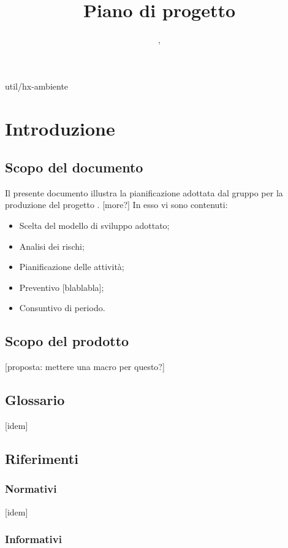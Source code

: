 
 {util/hx-ambiente}
\author{\LB, \PB}
\supervisor{\GG, \MM}
\title{Piano di progetto}

\renewcommand{\arraystretch}{1.5}
\setcounter{tocdepth}{4}
\setcounter{secnumdepth}{4}


\maketitle

\tableofcontents

\section{Introduzione}
	\subsection{Scopo del documento}
	Il presente documento illustra la pianificazione adottata dal gruppo {\hx} per la produzione del progetto {\proj}. [more?] In esso vi sono contenuti:
\begin{itemize}
	\item Scelta del modello di sviluppo adottato;
	\item Analisi dei rischi;
	\item Pianificazione delle attività;
	\item Preventivo [blablabla];
    \item Consuntivo di periodo.
\end{itemize}

	\subsection{Scopo del prodotto}
	[proposta: mettere una macro per questo?]
	\subsection{Glossario}
	[idem]
	\subsection{Riferimenti}
		\subsubsection{Normativi}
		[idem]
		\subsubsection{Informativi}


